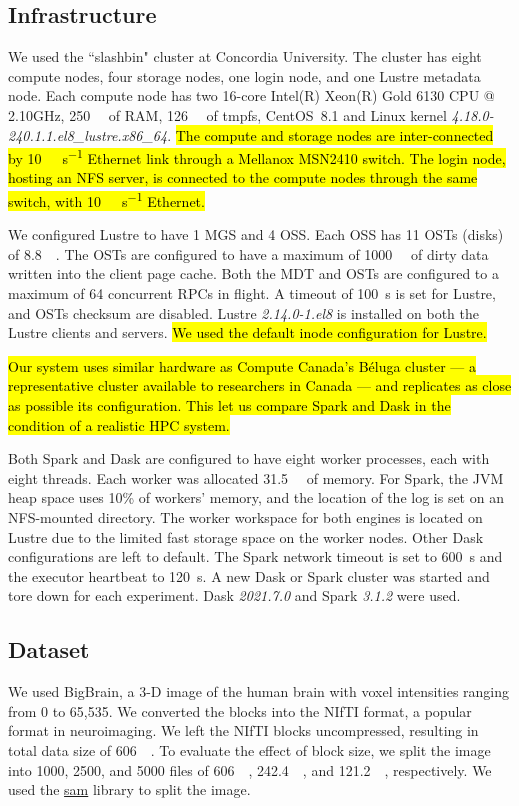 \documentclass[AMA,STIX1COL]{WileyNJD-v2}
\newcommand{\HL}[1]{\hl{#1}}
\begin{document}
\subsection{Infrastructure}
We used the ``slashbin" cluster at Concordia University.
The cluster has eight compute nodes, four storage nodes, one login node, and one Lustre metadata node.
Each compute node has two 16-core Intel(R) Xeon(R) Gold 6130 CPU @ 2.10GHz,
\SI{250}{\gibi\byte} of RAM, \SI{126}{\gibi\byte} of tmpfs,
CentOS~8.1 and Linux kernel \textit{4.18.0-240.1.1.el8\_lustre.x86\_64}.
\HL{The compute and storage nodes are inter-connected by {\SI{10}{\giga\bit\per\second}} Ethernet link through a Mellanox MSN2410 switch.
	The login node, hosting an NFS server, is connected to the compute nodes through the same switch, with {\SI{10}{\giga\bit\per\second}} Ethernet.}
		
We configured Lustre to have 1 MGS and 4 OSS.
Each OSS has 11 OSTs (disks) of \SI{8.8}{\tebi\byte}.
The OSTs are configured to have a maximum of \SI{1000}{\mebi\byte} of dirty data written into the client page cache.
Both the MDT and OSTs are configured to a maximum of 64 concurrent RPCs in flight.
A timeout of \SI{100}{\second} is set for Lustre, and OSTs checksum are disabled.
Lustre \textit{2.14.0-1.el8} is installed on both the Lustre clients and servers.
\HL{We used the default inode configuration for Lustre.}
		
\HL{Our system uses similar hardware as Compute Canada's B\'eluga cluster --- a representative cluster available to researchers in Canada --- and replicates as
	close as possible its configuration.
	This let us compare Spark and Dask in the condition of a realistic
HPC system.}
			
Both Spark and Dask are configured to have eight worker processes, each with eight threads.
Each worker was allocated \SI{31.5}{\gibi\byte} of memory.
For Spark, the JVM heap space uses 10\% of workers' memory, and the location of the log is set on an NFS-mounted directory.
The worker workspace for both engines is located on Lustre due to the limited fast storage space on the worker nodes.
Other Dask configurations are left to default.
The Spark network timeout is set to \SI{600}{\second} and the executor heartbeat to \SI{120}{\second}.
A new Dask or Spark cluster was started and tore down for each experiment.
Dask \textit{2021.7.0} and Spark \textit{3.1.2} were used.
			
\subsection{Dataset}
We used BigBrain\cite{Amunts:13}, a 3-D image of the human brain with voxel
intensities ranging from 0 to 65,535. We converted the blocks into the
NIfTI format, a popular format in neuroimaging. We left the NIfTI blocks
uncompressed, resulting in total data size of \SI{606}{\gibi\byte}. To
evaluate the effect of block size, we split the image into 1000, 2500,
and 5000 files of \SI{606}{\mebi\byte}, \SI{242.4}{\mebi\byte}, and
\SI{121.2}{\mebi\byte}, respectively.
We used the \href{https://github.com/big-data-lab-team/sam}{sam} library to split the image.
				
\end{document}
